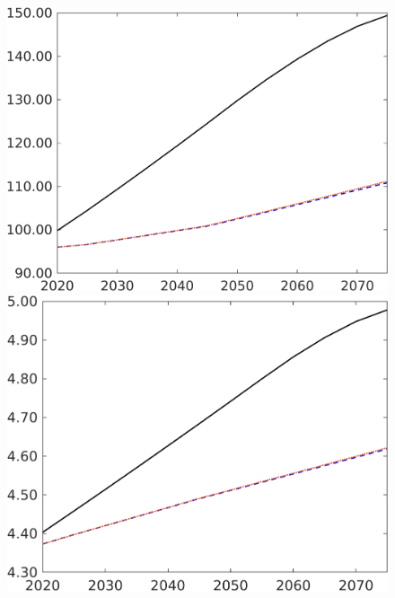 \begin{figure}[h!!]
\begin{minipage}[]{0.32\textwidth}
	\end{minipage}
\begin{minipage}[]{0.32\textwidth}
\includegraphics[width=1\textwidth]{../../codding_model/own_basedOnFried/optimalPol_elastS_DisuSci/figures/all_1705/Ag_CompEffOPT_T_NoTaus_spillover0_sep1_BN0_ineq0_red0_etaa0.79_lgd0.png}
\end{minipage}
	\begin{minipage}[]{0.32\textwidth}
		\includegraphics[width=1\textwidth]{../../codding_model/own_basedOnFried/optimalPol_elastS_DisuSci/figures/all_1705/An_CompEffOPT_T_NoTaus_spillover0_sep1_BN0_ineq0_red0_etaa0.79_lgd0.png}

\end{minipage}
\end{figure}
